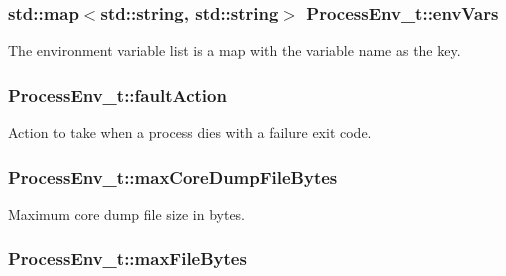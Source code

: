 \subsubsection[{\texorpdfstring{env\+Vars}{envVars}}]{\setlength{\rightskip}{0pt plus 5cm}std\+::map$<$std\+::string, std\+::string$>$ Process\+Env\+\_\+t\+::env\+Vars}\hypertarget{struct_process_env__t_af429a708c25492bb5edf27cf72a56c30}{}\label{struct_process_env__t_af429a708c25492bb5edf27cf72a56c30}


The environment variable list is a map with the variable name as the key. 

\subsubsection[{\texorpdfstring{fault\+Action}{faultAction}}]{ Process\+Env\+\_\+t\+::fault\+Action}\hypertarget{struct_process_env__t_ae05732c371b2e01522ff40a792c11416}{}\label{struct_process_env__t_ae05732c371b2e01522ff40a792c11416}


Action to take when a process dies with a failure exit code. 

\subsubsection[{\texorpdfstring{max\+Core\+Dump\+File\+Bytes}{maxCoreDumpFileBytes}}]{ Process\+Env\+\_\+t\+::max\+Core\+Dump\+File\+Bytes}\hypertarget{struct_process_env__t_a96d84e8665f1ade501edfa2a71d15461}{}\label{struct_process_env__t_a96d84e8665f1ade501edfa2a71d15461}


Maximum core dump file size in bytes. 

\subsubsection[{\texorpdfstring{max\+File\+Bytes}{maxFileBytes}}]{ Process\+Env\+\_\+t\+::max\+File\+Bytes}\hypertarget{struct_process_env__t_abc8419c85e89660a1b45f4db9e1aa1a8}{}\label{struct_process_env__t_abc8419c85e89660a1b45f4db9e1aa1a8}


